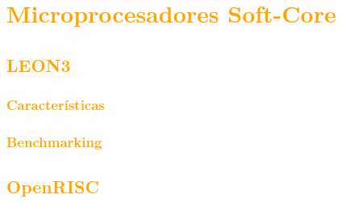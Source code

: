 \documentclass[a4paper,11pt]{article}
\begin{document}

	\section{\textcolor{orange}{Microprocesadores Soft-Core}}
	\subsection{\textcolor{orange}{LEON3}}
		\subsubsection{\textcolor{orange}{Características}}
		\subsubsection{\textcolor{orange}{Benchmarking}}
	\subsection{\textcolor{orange}{OpenRISC}}
\end{document}
